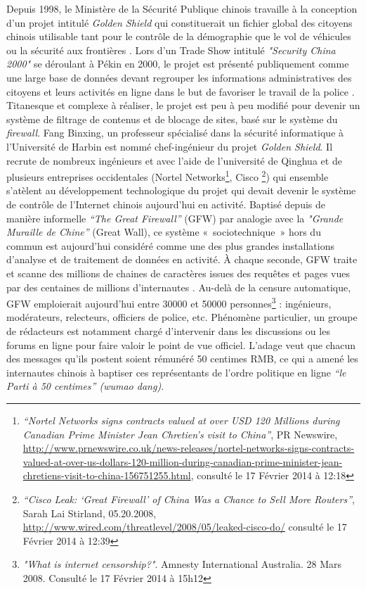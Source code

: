 Depuis 1998, le Ministère de la Sécurité Publique chinois travaille à la conception d’un projet intitulé \textit{Golden Shield} qui constituerait un fichier global des citoyens chinois utilisable tant pour le contrôle de la démographie que le vol de véhicules ou la sécurité aux frontières \citep{Lyons2009}. Lors d’un Trade Show intitulé \textit{"Security China 2000"} se déroulant à Pékin en 2000, le projet est présenté publiquement comme une large base de données devant regrouper les informations administratives des citoyens et leurs activités en ligne dans le but de favoriser le travail de la police \citep{Walton2001}. Titanesque et complexe à réaliser, le projet est peu à peu modifié pour devenir un système de filtrage de contenus et de blocage de sites, basé sur le système du \textit{firewall}. Fang Binxing, un professeur spécialisé dans la sécurité informatique à l’Université de Harbin est nommé chef-ingénieur du projet \textit{Golden Shield}. Il recrute de nombreux ingénieurs et avec l’aide de l’université de Qinghua et de plusieurs entreprises occidentales (Nortel Networks\footnote{\textit{“Nortel Networks signs contracts valued at over USD 120 Millions during Canadian Prime Minister Jean Chretien’s visit to China”}, PR Newswire, \url{http://www.prnewswire.co.uk/news-releases/nortel-networks-signs-contracts-valued-at-over-us-dollars-120-million-during-canadian-prime-minister-jean-chretiens-visit-to-china-156751255.html}, consulté le 17 Février 2014 à 12:18}, Cisco \footnote{\textit{“Cisco Leak: ‘Great Firewall’ of China Was a Chance to Sell More Routers”}, 
Sarah Lai Stirland, 05.20.2008, \url{http://www.wired.com/threatlevel/2008/05/leaked-cisco-do/} consulté le 17 Février 2014 à 12:39}) qui ensemble s’atèlent au développement technologique du projet qui devait devenir le système de contrôle de l’Internet chinois aujourd’hui en activité. Baptisé depuis de manière informelle \textit{“The Great Firewall”} (GFW) par analogie avec la \textit{"Grande Muraille de Chine”} (Great Wall), ce système « sociotechnique » hors du commun est aujourd’hui considéré comme une des plus grandes installations d’analyse et de traitement de données en activité. À chaque seconde, GFW traite et scanne des millions de chaines de caractères issues des requêtes et pages vues par des centaines de millions d’internautes \citep{Winter2012}. Au-delà de la censure automatique, GFW emploierait aujourd’hui entre 30000 et 50000 personnes\footnote{\textit{"What is internet censorship?"}. Amnesty International Australia. 28 Mars 2008. Consulté le 17 Février 2014 à 15h12} : ingénieurs, modérateurs, relecteurs, officiers de police, etc. Phénomène particulier, un groupe de rédacteurs est notamment chargé d’intervenir dans les discussions ou les forums en ligne pour faire valoir le point de vue officiel. L’adage veut que chacun des messages qu’ils postent soient rémunéré 50 centimes RMB, ce qui a amené les internautes chinois à baptiser ces représentants de l’ordre politique en ligne \textit{“le Parti à 50 centimes” (wumao dang)}.

